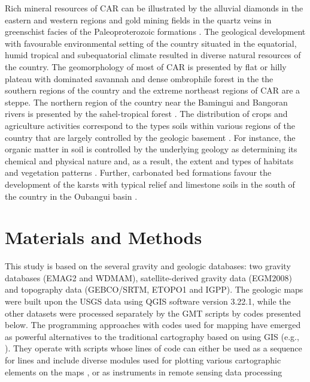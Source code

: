 \documentclass[minerals,article,submit,pdftex,moreauthors]{Definitions/mdpi}
\begin{document}
Rich mineral resources of CAR can be illustrated by the alluvial diamonds in the eastern and western regions \cite{USGSreportFR2013} and gold mining fields in the quartz veins in greenschist facies of the Paleoproterozoic formations \cite{KPEOU2020103825}. The geological development with favourable environmental setting of the country situated in the equatorial, humid tropical and subequatorial climate resulted in diverse natural resources of the country. The geomorphology of most of CAR is presented by flat or hilly plateau with dominated savannah \cite{Nguimalet} and dense ombrophile forest in the the southern regions of the country \cite{Suchel} and the extreme northeast regions of CAR are a steppe. The northern region of the country near the Bamingui  and Bangoran rivers is presented by the sahel-tropical forest \cite{Spinage1988}. The distribution of crops and agriculture activities correspond to the types soils within various regions of the country that are largely controlled by the geologic basement \cite{Villien1988,Quantin1965,Prioul}. For instance, the organic matter in soil is controlled by the underlying geology as determining its chemical and physical nature and, as a result, the extent and types of habitats and vegetation patterns \cite{CombeauQuantin,Quantin1962}. Further, carbonated bed formations favour the development of the karsts with typical relief and limestone soils in the south of the country in the Oubangui basin \cite{Salomon}.

\section{Materials and Methods}
This study is based on the several gravity and geologic databases: two gravity databases (EMAG2 and WDMAM), satellite-derived gravity data (EGM2008) and topography data (GEBCO/SRTM, ETOPO1 and IGPP). The geologic maps were built upon the USGS data using QGIS software version 3.22.1, while the other datasets were processed separately by the GMT scripts by codes presented below. The programming approaches with codes used for mapping have emerged as powerful alternatives to the traditional cartography based on using GIS (e.g., \cite{TRAORE2020103933,RUNGE2005311,TRAORE2021100114}). They operate with scripts whose lines of code can either be used as a sequence for lines and include diverse modules used for plotting various cartographic elements on the maps \cite{4814952,Lemenkova202230,8588718,Lemenkova202301,Lemenkova202228}, or as instruments in remote sensing data processing \cite{9964623,Lemenkova202229,7577632,Lemenkova202227}
\end{document}
